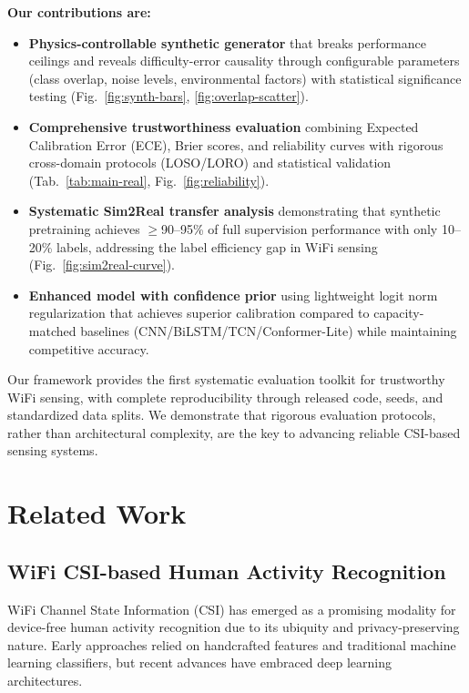 \documentclass[10pt,conference]{IEEEtran}
\begin{document}
\textbf{Our contributions are:}
\begin{itemize}
  \item \textbf{Physics-controllable synthetic generator} that breaks performance ceilings and reveals difficulty-error causality through configurable parameters (class overlap, noise levels, environmental factors) with statistical significance testing (Fig.~\ref{fig:synth-bars}, \ref{fig:overlap-scatter}).
  \item \textbf{Comprehensive trustworthiness evaluation} combining Expected Calibration Error (ECE), Brier scores, and reliability curves with rigorous cross-domain protocols (LOSO/LORO) and statistical validation (Tab.~\ref{tab:main-real}, Fig.~\ref{fig:reliability}).
  \item \textbf{Systematic Sim2Real transfer analysis} demonstrating that synthetic pretraining achieves $\geq$90--95\% of full supervision performance with only 10--20\% labels, addressing the label efficiency gap in WiFi sensing (Fig.~\ref{fig:sim2real-curve}).
  \item \textbf{Enhanced model with confidence prior} using lightweight logit norm regularization that achieves superior calibration compared to capacity-matched baselines (CNN/BiLSTM/TCN/Conformer-Lite) while maintaining competitive accuracy.
\end{itemize}

Our framework provides the first systematic evaluation toolkit for trustworthy WiFi sensing, with complete reproducibility through released code, seeds, and standardized data splits. We demonstrate that rigorous evaluation protocols, rather than architectural complexity, are the key to advancing reliable CSI-based sensing systems.

\section{Related Work}

\subsection{WiFi CSI-based Human Activity Recognition}
WiFi Channel State Information (CSI) has emerged as a promising modality for device-free human activity recognition due to its ubiquity and privacy-preserving nature. Early approaches relied on handcrafted features and traditional machine learning classifiers, but recent advances have embraced deep learning architectures.
\end{document}
